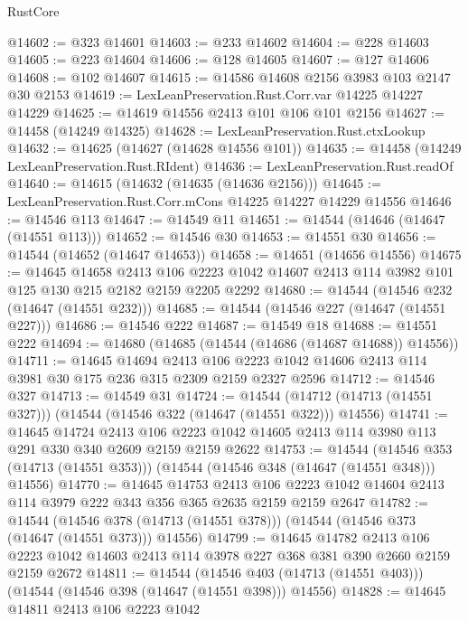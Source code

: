 \begin{lexlean}{RustCore}
\begin{coremodule}
@14602 := @323 @14601
@14603 := @233 @14602
@14604 := @228 @14603
@14605 := @223 @14604
@14606 := @128 @14605
@14607 := @127 @14606
@14608 := @102 @14607
@14615 := @14586 @14608 @2156 @3983 @103 @2147 @30 @2153
@14619 := LexLeanPreservation.Rust.Corr.var @14225 @14227 @14229
@14625 := @14619 @14556 @2413 @101 @106 @101 @2156
@14627 := @14458 (@14249 @14325)
@14628 := LexLeanPreservation.Rust.ctxLookup
@14632 := @14625 (@14627 (@14628 @14556 @101))
@14635 := @14458 (@14249 LexLeanPreservation.Rust.RIdent)
@14636 := LexLeanPreservation.Rust.readOf
@14640 := @14615 (@14632 (@14635 (@14636 @2156)))
@14645 := LexLeanPreservation.Rust.Corr.mCons @14225 @14227 @14229 @14556
@14646 := @14546 @113
@14647 := @14549 @11
@14651 := @14544 (@14646 (@14647 (@14551 @113)))
@14652 := @14546 @30
@14653 := @14551 @30
@14656 := @14544 (@14652 (@14647 @14653))
@14658 := @14651 (@14656 @14556)
@14675 := @14645
    @14658
    @2413
    @106
    @2223
    @1042
    @14607
    @2413
    @114
    @3982
    @101
    @125
    @130
    @215
    @2182
    @2159
    @2205
    @2292
@14680 := @14544 (@14546 @232 (@14647 (@14551 @232)))
@14685 := @14544 (@14546 @227 (@14647 (@14551 @227)))
@14686 := @14546 @222
@14687 := @14549 @18
@14688 := @14551 @222
@14694 := @14680 (@14685 (@14544 (@14686 (@14687 @14688)) @14556))
@14711 := @14645
    @14694
    @2413
    @106
    @2223
    @1042
    @14606
    @2413
    @114
    @3981
    @30
    @175
    @236
    @315
    @2309
    @2159
    @2327
    @2596
@14712 := @14546 @327
@14713 := @14549 @31
@14724 := @14544
    (@14712 (@14713 (@14551 @327)))
    (@14544 (@14546 @322 (@14647 (@14551 @322))) @14556)
@14741 := @14645
    @14724
    @2413
    @106
    @2223
    @1042
    @14605
    @2413
    @114
    @3980
    @113
    @291
    @330
    @340
    @2609
    @2159
    @2159
    @2622
@14753 := @14544
    (@14546 @353 (@14713 (@14551 @353)))
    (@14544 (@14546 @348 (@14647 (@14551 @348))) @14556)
@14770 := @14645
    @14753
    @2413
    @106
    @2223
    @1042
    @14604
    @2413
    @114
    @3979
    @222
    @343
    @356
    @365
    @2635
    @2159
    @2159
    @2647
@14782 := @14544
    (@14546 @378 (@14713 (@14551 @378)))
    (@14544 (@14546 @373 (@14647 (@14551 @373))) @14556)
@14799 := @14645
    @14782
    @2413
    @106
    @2223
    @1042
    @14603
    @2413
    @114
    @3978
    @227
    @368
    @381
    @390
    @2660
    @2159
    @2159
    @2672
@14811 := @14544
    (@14546 @403 (@14713 (@14551 @403)))
    (@14544 (@14546 @398 (@14647 (@14551 @398))) @14556)
@14828 := @14645
    @14811
    @2413
    @106
    @2223
    @1042

\end{coremodule}
\end{lexlean}
